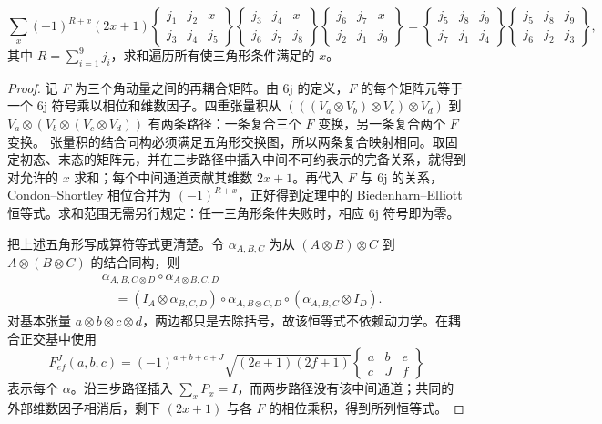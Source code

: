 \begin{theorem}
\[
\sum_x(-1)^{R+x}(2x+1)
\begin{Bmatrix}j_1&j_2&x\\j_3&j_4&j_5\end{Bmatrix}
\begin{Bmatrix}j_3&j_4&x\\j_6&j_7&j_8\end{Bmatrix}
\begin{Bmatrix}j_6&j_7&x\\j_2&j_1&j_9\end{Bmatrix}
=
\begin{Bmatrix}j_5&j_8&j_9\\j_7&j_1&j_4\end{Bmatrix}
\begin{Bmatrix}j_5&j_8&j_9\\j_6&j_2&j_3\end{Bmatrix},
\]
其中 $R=\sum_{i=1}^9 j_i$，求和遍历所有使三角形条件满足的 $x$。
\label{thm:biedenharn-elliott}
\end{theorem}

\begin{proof}
记 $F$ 为三个角动量之间的再耦合矩阵。由 6j 的定义，$F$ 的每个矩阵元等于一个 6j 符号乘以相位和维数因子。四重张量积从 $(((V_a\otimes V_b)\otimes V_c)\otimes V_d)$ 到 $V_a\otimes(V_b\otimes(V_c\otimes V_d))$ 有两条路径：一条复合三个 $F$ 变换，另一条复合两个 $F$ 变换。
张量积的结合同构必须满足五角形交换图，所以两条复合映射相同。取固定初态、末态的矩阵元，并在三步路径中插入中间不可约表示的完备关系，就得到对允许的 $x$ 求和；每个中间通道贡献其维数 $2x+1$。再代入 $F$ 与 6j 的关系，Condon--Shortley 相位合并为 $(-1)^{R+x}$，正好得到定理中的 Biedenharn--Elliott 恒等式。求和范围无需另行规定：任一三角形条件失败时，相应 6j 符号即为零。

把上述五角形写成算符等式更清楚。令 $\alpha_{A,B,C}$ 为从 $(A\otimes B)\otimes C$ 到 $A\otimes(B\otimes C)$ 的结合同构，则
\[
\begin{aligned}
&\alpha_{A,B,C\otimes D}\circ\alpha_{A\otimes B,C,D}\\
&\quad=(I_A\otimes\alpha_{B,C,D})
\circ\alpha_{A,B\otimes C,D}
\circ(\alpha_{A,B,C}\otimes I_D).
\end{aligned}
\]
对基本张量 $a\otimes b\otimes c\otimes d$，两边都只是去除括号，故该恒等式不依赖动力学。在耦合正交基中使用
\[
F^J_{ef}(a,b,c)
=(-1)^{a+b+c+J}\sqrt{(2e+1)(2f+1)}
\begin{Bmatrix}a&b&e\\c&J&f\end{Bmatrix}
\]
表示每个 $\alpha$。沿三步路径插入 $\sum_xP_x=I$，而两步路径没有该中间通道；共同的外部维数因子相消后，剩下 $(2x+1)$ 与各 $F$ 的相位乘积，得到所列恒等式。
\end{proof}

